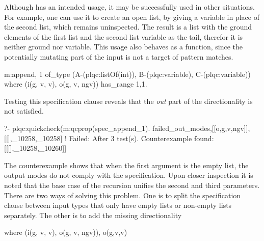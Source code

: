 Although  has an intended usage, it may be successfully
used in other situations.
%
For example, one can use it to create an open list, by giving a variable
in place of the second list, which remains uninspected.
%
The result is a list with the ground elements of the first list and the
second list variable as the tail, therefor it is neither ground nor
variable.
%
This usage also behaves as a function, since the potentially mutating
part of the input is not a target of pattern matches.
%
\begin{yapcode}
 {m:append, 1} of_type
     (A-(plqc:listOf(int)), B-(plqc:variable), C-(plqc:variable))
   where (i(g, v, v), o(g, v, ngv))  has_range {1,1}.
\end{yapcode}
%
Testing this specification clause reveals that the \emph{out} part of
the directionality is not satisfied.
\begin{yapcode}
  ?- plqc:quickcheck(m:qcprop(spec_append_1).
 {failed_out_modes,[[o,g,v,ngv]], [[],_10258,_10258]}
 !
 Failed: After 3 test(s).
 Counterexample found: [[[],_10258,_10260]] 
\end{yapcode}
%
The counterexample shows that when the first argument is the empty
list, %
the output modes do not comply with
the specification.
%
Upon closer inspection it is noted that the base case of the recursion
unifies the second and third parameters.
%
There are two %
ways of solving this problem.
%
One is to split the specification clause between input types that only
have empty lists or non-empty lists separately.
%
The other is to add the missing directionality
%
%
\begin{yapcode}
   where (i(g, v, v), o(g, v, ngv)), o(g,v,v)
\end{yapcode}



